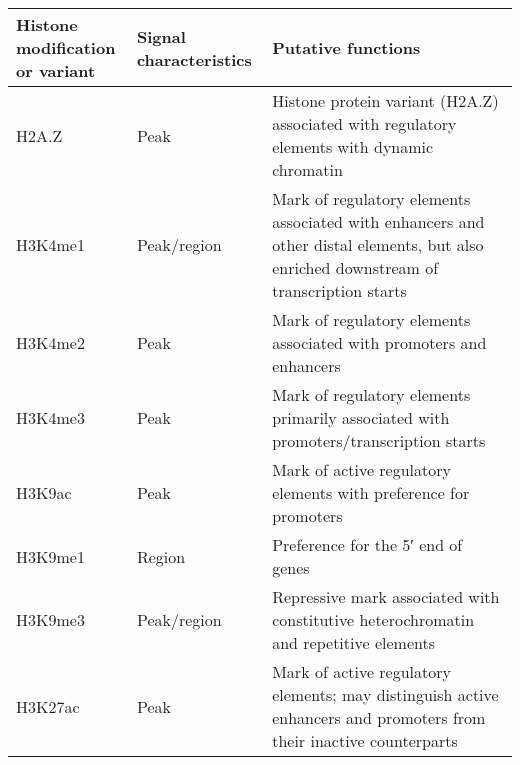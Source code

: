 \begin{table}[h]
   \footnotesize
   \begin{tabular}{l l p{5cm}}
\pbox[b]{20cm}{ \textbf{Histone modification} \\ \textbf{or variant} } & \textbf{Signal characteristics} & \textbf{Putative functions}                                                                                         \\ \hline
H2A.Z                           & Peak                   & Histone protein variant (H2A.Z) associated with regulatory elements with dynamic chromatin                                            \\ \hline
H3K4me1                         & Peak/region            & Mark of regulatory elements associated with enhancers and other distal elements, but also enriched downstream of transcription starts \\ \hline
H3K4me2                         & Peak                   & Mark of regulatory elements associated with promoters and enhancers                                                                   \\ \hline
H3K4me3                         & Peak                   & Mark of regulatory elements primarily associated with promoters/transcription starts                                                  \\ \hline
H3K9ac                          & Peak                   & Mark of active regulatory elements with preference for promoters                                                                      \\ \hline
H3K9me1                         & Region                 & Preference for the 5′ end of genes                                                                                                    \\ \hline
H3K9me3                         & Peak/region            & Repressive mark associated with constitutive heterochromatin and repetitive elements                                                  \\ \hline
H3K27ac                         & Peak                   & Mark of active regulatory elements; may distinguish active enhancers and promoters from their inactive counterparts                   \\ \hline

\end{tabular}
\end{table}
